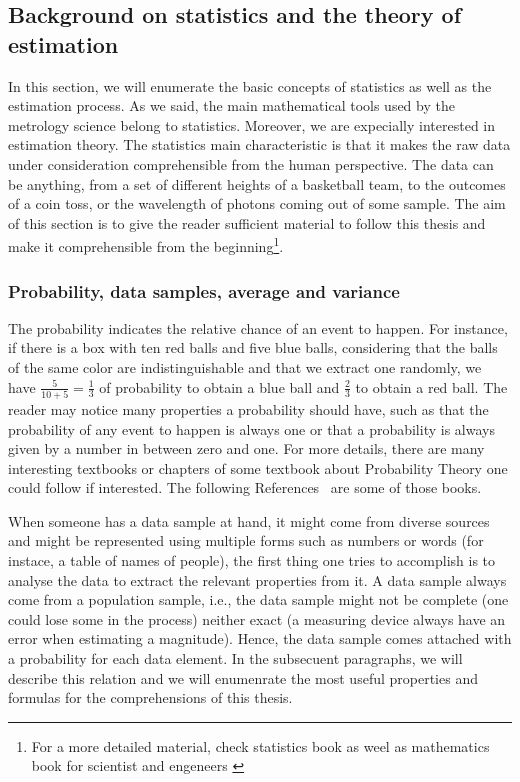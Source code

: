 \subsection{Background on statistics and the theory of estimation}

In this section, we will enumerate the basic concepts of statistics as well as the estimation process.
As we said, the main mathematical tools used by the metrology science belong to statistics.
Moreover, we are expecially interested in estimation theory.
The statistics main characteristic is that it makes the raw data under consideration comprehensible from the human perspective.
The data can be anything, from a set of different heights of a basketball team, to the outcomes of a coin toss, or the wavelength of photons coming out of some sample.
The aim of this section is to give the reader sufficient material to follow this thesis and make it comprehensible from the beginning\footnote{
For a more detailed material, check statistics book as weel as mathematics book for scientist and engeneers \citep{Riley1998, BarlowXXXX}}.

\subsubsection{Probability, data samples, average and variance}

The probability indicates the relative chance of an event to happen.
For instance, if there is a box with ten red balls and five blue balls, considering that the balls of the same color are indistinguishable and that we extract one randomly, we have $\frac{5}{10+5}=\frac{1}{3}$ of probability to obtain a blue ball and $\frac{2}{3}$ to obtain a red ball.
The reader may notice many properties a probability should have, such as that the probability of any event to happen is always one or that a probability is always given by a number in between zero and one.
For more details, there are many interesting textbooks or chapters of some textbook about Probability Theory one could follow if interested.
The following References~\citep{Riley1998, BarlowXXXX} are some of those books.

When someone has a data sample at hand, it might come from diverse sources and might be represented using multiple forms such as numbers or words (for instace, a table of names of people), the first thing one tries to accomplish is to analyse the data to extract the relevant properties from it.
A data sample always come from a population sample, i.e., the data sample might not be complete (one could lose some in the process) neither exact (a measuring device always have an error when estimating a magnitude).
Hence, the data sample comes attached with a probability for each data element.
In the subsecuent paragraphs, we will describe this relation and we will enumenrate the most useful properties and formulas for the comprehensions of this thesis.

